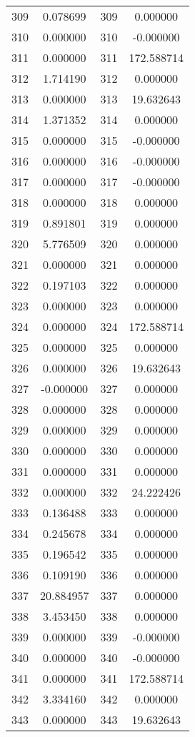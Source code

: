 \documentclass[12pt]{article}
\begin{document}
\begin{longtable}{@{}cccc@{}}
309 & 0.078699 & 309 & 0.000000 \\
310 & 0.000000 & 310 & -0.000000 \\
311 & 0.000000 & 311 & 172.588714 \\
312 & 1.714190 & 312 & 0.000000 \\
313 & 0.000000 & 313 & 19.632643 \\
314 & 1.371352 & 314 & 0.000000 \\
315 & 0.000000 & 315 & -0.000000 \\
316 & 0.000000 & 316 & -0.000000 \\
317 & 0.000000 & 317 & -0.000000 \\
318 & 0.000000 & 318 & 0.000000 \\
319 & 0.891801 & 319 & 0.000000 \\
320 & 5.776509 & 320 & 0.000000 \\
321 & 0.000000 & 321 & 0.000000 \\
322 & 0.197103 & 322 & 0.000000 \\
323 & 0.000000 & 323 & 0.000000 \\
324 & 0.000000 & 324 & 172.588714 \\
325 & 0.000000 & 325 & 0.000000 \\
326 & 0.000000 & 326 & 19.632643 \\
327 & -0.000000 & 327 & 0.000000 \\
328 & 0.000000 & 328 & 0.000000 \\
329 & 0.000000 & 329 & 0.000000 \\
330 & 0.000000 & 330 & 0.000000 \\
331 & 0.000000 & 331 & 0.000000 \\
332 & 0.000000 & 332 & 24.222426 \\
333 & 0.136488 & 333 & 0.000000 \\
334 & 0.245678 & 334 & 0.000000 \\
335 & 0.196542 & 335 & 0.000000 \\
336 & 0.109190 & 336 & 0.000000 \\
337 & 20.884957 & 337 & 0.000000 \\
338 & 3.453450 & 338 & 0.000000 \\
339 & 0.000000 & 339 & -0.000000 \\
340 & 0.000000 & 340 & -0.000000 \\
341 & 0.000000 & 341 & 172.588714 \\
342 & 3.334160 & 342 & 0.000000 \\
343 & 0.000000 & 343 & 19.632643 \\

\end{longtable}
\end{document}
